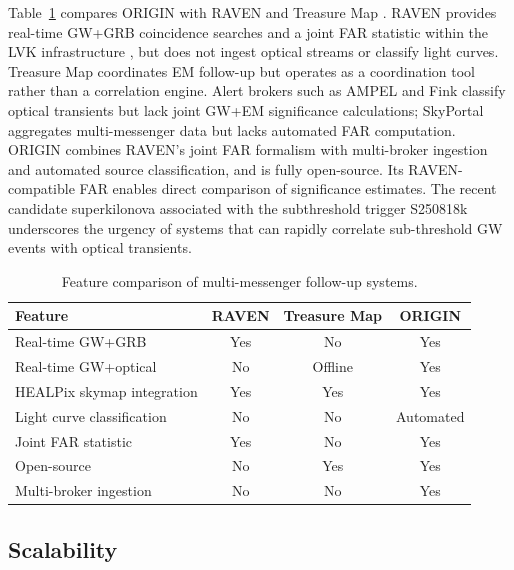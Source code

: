 \documentclass[twocolumn]{article}
\begin{document}
Table~\ref{tab:comparison} compares ORIGIN with RAVEN \citep{Urban2016} and Treasure Map \citep{Wyatt2020}. RAVEN provides real-time GW+GRB coincidence searches and a joint FAR statistic within the LVK infrastructure \citep{Chaudhary2024}, but does not ingest optical streams or classify light curves. Treasure Map coordinates EM follow-up but operates as a coordination tool rather than a correlation engine. Alert brokers such as AMPEL \citep{Nordin2019} and Fink \citep{Moller2021} classify optical transients but lack joint GW+EM significance calculations; SkyPortal \citep{Coughlin2023} aggregates multi-messenger data but lacks automated FAR computation. ORIGIN combines RAVEN's joint FAR formalism with multi-broker ingestion and automated source classification, and is fully open-source. Its RAVEN-compatible FAR enables direct comparison of significance estimates. The recent candidate superkilonova associated with the subthreshold trigger S250818k \citep{Kasliwal2025} underscores the urgency of systems that can rapidly correlate sub-threshold GW events with optical transients.

\begin{table}[htbp]
\centering
\caption{Feature comparison of multi-messenger follow-up systems. \label{tab:comparison}}
\begin{tabular}{lccc}
\toprule
Feature & RAVEN & Treasure Map & ORIGIN \\
\midrule
Real-time GW+GRB            & Yes     & No        & Yes \\
Real-time GW+optical        & No      & Offline   & Yes \\
HEALPix skymap integration  & Yes     & Yes       & Yes \\
Light curve classification   & No      & No        & Automated \\
Joint FAR statistic          & Yes     & No        & Yes \\
Open-source                  & No      & Yes       & Yes \\
Multi-broker ingestion       & No      & No        & Yes \\
\bottomrule
\end{tabular}
\end{table}

\subsection{Scalability} \label{sec:scalability}
\end{document}
